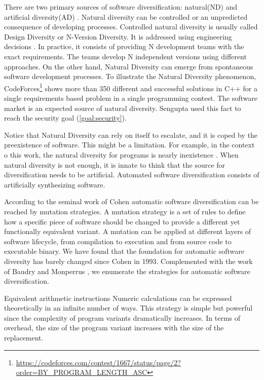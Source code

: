 There are two primary sources of software diversification: natural(ND) and artificial diversity(AD) \cite{natural_diversity}. Natural diversity can be controlled or an unpredicted consequence of developing processes. Controlled natural diversity is usually called Design Diversity or N-Version Diversity. It is addressed using engineering decisions \cite{1659219}. In practice, it consists of providing N development teams with the exact requirements. The teams develop N independent versions using different approaches. On the other hand, Natural Diversity can emerge from spontaneous software development processes. To illustrate the Natural Diversity phenomenon, CodeForces\footnote{\url{https://codeforces.com/contest/1667/status/page/2?order=BY_PROGRAM_LENGTH_ASC}} shows more than 350 different and successful solutions in C++ for a single requirements based problem in a single programming contest. 
The software market is an expected source of natural diversity. Sengupta \etal \cite{10.5555/3091125.3091155} used this fact to reach the security goal (\autoref{goal:security}).



Notice that Natural Diversity can rely on itself to escalate, and it is coped by the preexistence of software. This might be a limitation. For example, in the context o this work, the natural diversity for \wasm programs is nearly inexistence \cite{Hilbig2021AnES}. When natural diversity is not enough, it is innate to think that the source for diversification needs to be artificial. Automated software diversification consists of artificially synthesizing software.

According to the seminal work of Cohen \etal \cite{cohen1993operating} automatic software diversification can be reached by mutation strategies. A mutation strategy is a set of rules to define how a specific piece of software should be changed to provide a different yet functionally equivalent variant. A mutation can be applied at different layers of software lifecycle, from compilation to execution and from source code to executable binary. We have found that the foundation for automatic software diversity has barely changed since Cohen in 1993. Complemented with the work of Baudry and Monperrus \cite{natural_diversity}, we enumerate the strategies for automatic software diversification. 

\begin{strategy}{Equivalent arithmetic instructions}
    \label{strategy:S1}
    \normalfont
    Numeric calculations can be expressed theoretically in an infinite number of ways. This strategy is simple but powerful since the complexity of program variants dramatically increases. In terms of overhead, the size of the program variant increases with the size of the replacement. 
    
\end{strategy}


